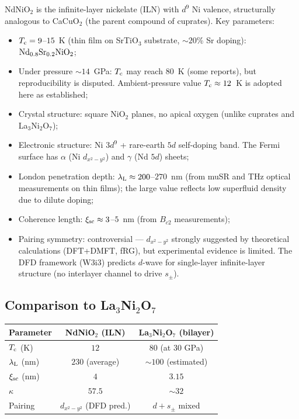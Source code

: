 \documentclass[11pt]{article}
\newcommand{\lambdaL}{\lambda_{\rm L}}
\newcommand{\xsc}{\xi_{\rm sc}}
\newcommand{\Tc}{T_{\rm c}}
\begin{document}
NdNiO$_2$ is the infinite-layer nickelate (ILN) with $d^9$ Ni valence,
structurally analogous to CaCuO$_2$ (the parent compound of cuprates). Key
parameters:

\begin{itemize}
\item $\Tc = 9$--$15$~K (thin film on SrTiO$_3$ substrate, $\sim 20$\%
  Sr doping): $\rm Nd_{0.8}Sr_{0.2}NiO_2$;
\item Under pressure $\sim 14$~GPa: $\Tc$ may reach $80$~K (some reports),
  but reproducibility is disputed. Ambient-pressure value $\Tc \approx 12$~K
  is adopted here as established;
\item Crystal structure: square NiO$_2$ planes, no apical oxygen (unlike
  cuprates and La$_3$Ni$_2$O$_7$);
\item Electronic structure: Ni $3d^9$ + rare-earth $5d$ self-doping band.
  The Fermi surface has $\alpha$ (Ni $d_{x^2-y^2}$) and $\gamma$ (Nd $5d$)
  sheets;
\item London penetration depth: $\lambdaL \approx 200$--$270$~nm (from
  muSR and THz optical measurements on thin films); the large value reflects
  low superfluid density due to dilute doping;
\item Coherence length: $\xsc \approx 3$--$5$~nm (from $B_{c2}$ measurements);
\item Pairing symmetry: controversial --- $d_{x^2-y^2}$ strongly suggested
  by theoretical calculations (DFT+DMFT, fRG), but experimental evidence
  is limited. The DFD framework (W3i3) predicts $d$-wave for single-layer
  infinite-layer structure (no interlayer channel to drive $s_\pm$).
\end{itemize}

\subsection{Comparison to La$_3$Ni$_2$O$_7$}

\begin{center}
\begin{tabular}{lcc}
\toprule
Parameter & NdNiO$_2$ (ILN) & La$_3$Ni$_2$O$_7$ (bilayer) \\
\midrule
$\Tc$ (K) & $12$ & $80$ (at 30 GPa) \\
$\lambdaL$ (nm) & $230$ (average) & $\sim 100$ (estimated) \\
$\xsc$ (nm) & $4$ & $3.15$ \\
$\kappa$ & $57.5$ & $\sim 32$ \\
Pairing & $d_{x^2-y^2}$ (DFD pred.) & $d + s_\pm$ mixed \\
\bottomrule
\end{tabular}
\end{center}
\end{document}

